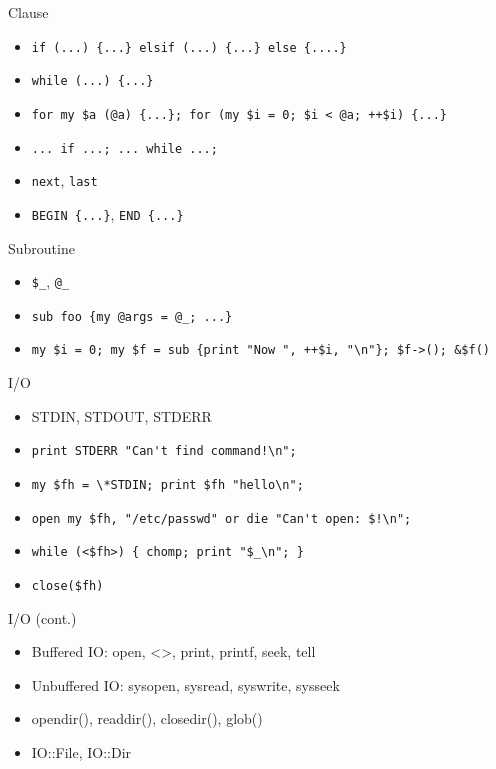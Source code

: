 \documentclass{beamer}
\begin{document}
\begin{frame}[containsverbatim]{Clause}
 \begin{itemize}
  \item \lstinline!if (...) {...} elsif (...) {...} else {....}!
  \item \lstinline!while (...) {...}!
  \item \lstinline!for my $a (@a) {...}; for (my $i = 0; $i < @a; ++$i) {...}!
  \item \lstinline!... if ...; ... while ...;!
  \item \lstinline!next!, \lstinline!last!
  \item \lstinline!BEGIN {...}!, \lstinline!END {...}!
 \end{itemize}
\end{frame}

\begin{frame}[containsverbatim]{Subroutine}
  \begin{itemize}
    \item \lstinline!$_!, \lstinline!@_!
    \item \lstinline!sub foo {my @args = @_; ...}!
    \item \lstinline!my $i = 0; my $f = sub {print "Now ", ++$i, "\n"}; $f->(); &$f()!
  \end{itemize}
\end{frame}

\begin{frame}[containsverbatim]{I/O}
  \begin{itemize}
    \item  STDIN, STDOUT, STDERR
    \item  \lstinline{print STDERR "Can't find command!\n";}
    \item  \lstinline{my $fh = \*STDIN; print $fh "hello\n";}
    \item  \lstinline{open my $fh, "/etc/passwd" or die "Can't open: $!\n";}
    \item  \lstinline!while (<$fh>) { chomp; print "$_\n"; }!
    \item  \lstinline!close($fh)!
  \end{itemize}
\end{frame}

\begin{frame}[containsverbatim]{I/O (cont.)}
  \begin{itemize}
    \item  Buffered IO: open, <>, print, printf, seek, tell
    \item  Unbuffered IO: sysopen, sysread, syswrite, sysseek
    \item  opendir(), readdir(), closedir(), glob()
    \item  IO::File, IO::Dir
  \end{itemize}
\end{frame}
\end{document}
